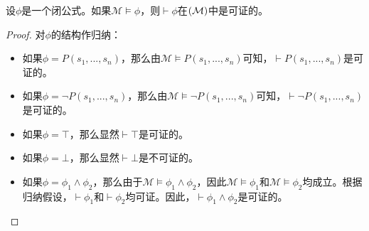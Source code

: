 \begin{theorem}[完备性]\label{thm:complete}
	设$\phi$是一个\ctlpm{}闭公式。如果$\mathcal{M}\models\phi$，则$\vdash\phi$在\SCTL$(\cal M)$中是可证的。
\end{theorem}
\begin{proof}
	对$\phi$的结构作归纳：
	\begin{itemize}
		
		\item 如果$\phi = P(s_1,...,s_n)$，那么由$\mathcal{M}\models P(s_1,...,s_n)$可知，$\vdash P(s_1,...,s_n)$是可证的。
		
		
		\item 如果$\phi = \neg P(s_1,...,s_n)$，那么由$\mathcal{M}\models \neg P(s_1,...,s_n)$可知，$\vdash \neg P(s_1,...,s_n)$是可证的。
		
		
		\item 如果$\phi = \top$，那么显然$\vdash \top$是可证的。
		
		\item 如果$\phi = \bot$，那么显然$\vdash \bot$是不可证的。
		
		
		\item 如果$\phi = \phi_1\wedge\phi_2$，那么由于$\mathcal{M}\models \phi_1\wedge\phi_2$，因此$\mathcal{M}\models \phi_1$和$\mathcal{M}\models \phi_2$均成立。根据归纳假设，$\vdash \phi_1$和$\vdash \phi_2$均可证。因此，$\vdash \phi_1\wedge\phi_2$是可证的。
		

\end{itemize}
\end{proof}
